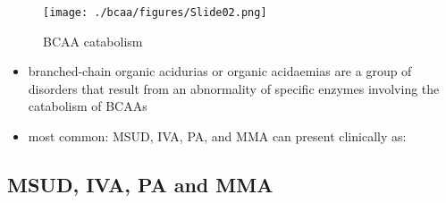 \documentclass{scrartcl}
\begin{document}
\begin{figure}[htbp]
\centering
\texttt{[image: ./bcaa/figures/Slide02.png]}
\caption{\label{fig:org8209a5e}
BCAA catabolism}
\end{figure}

\begin{itemize}
\item branched-chain organic acidurias or organic acidaemias are a group
of disorders that result from an abnormality of specific enzymes
involving the catabolism of BCAAs
\item most common: MSUD, IVA, PA, and MMA can present clinically as:
\end{itemize}

\subsection{MSUD, IVA, PA and MMA}
\label{sec:org9490877}
\end{document}
